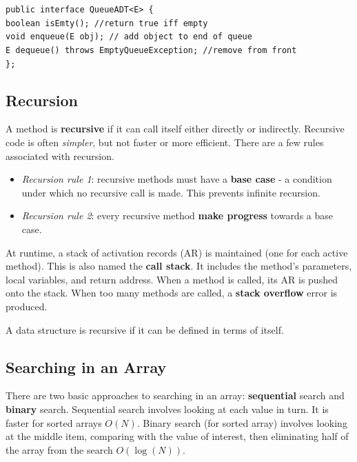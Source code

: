 \texttt{public interface QueueADT<E> \{} \\
\indent \indent \texttt{boolean isEmty(); //return true iff empty} \\
\indent \indent \texttt{void enqueue(E obj); // add object to end of queue} \\
\indent \indent \texttt{E dequeue() throws EmptyQueueException; //remove from front} \\
\indent \texttt{\};} \\

\subsection{Recursion}

A method is \textbf{recursive} if it can call itself either directly or indirectly. Recursive code is often \textit{simpler}, but not faster or more efficient. There are a few rules associated with recursion. 

\begin{itemize}
	\item \textit{Recursion rule 1}: recursive methods must have a \textbf{base case} - a condition under which no recursive call is made. This prevents infinite recursion. 
	\item \textit{Recursion rule 2}: every recursive method \textbf{make progress} towards a base case. 
\end{itemize}

At runtime, a stack of activation records (AR) is maintained (one for each active method). This is also named the \textbf{call stack}. It includes the method's parameters, local variables, and return address. When a method is called, its AR is pushed onto the stack. When too many methods are called, a \textbf{stack overflow} error is produced. 

A data structure is recursive if it can be defined in terms of itself. 

\subsection{Searching in an Array}

There are two basic approaches to searching in an array: \textbf{sequential} search and \textbf{binary} search. Sequential search involves looking at each value in turn. It is faster for sorted arrays $O(N)$. Binary search (for sorted array) involves looking at the middle item, comparing with the value of interest, then eliminating half of the array from the search $O(\log(N))$. 

